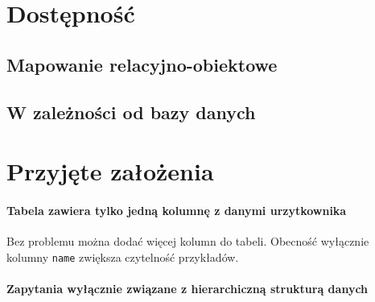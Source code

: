 \section{Dostępność}
\subsection{Mapowanie relacyjno-obiektowe}
\subsection{W zależności od bazy danych}


\section{Przyjęte założenia}

\paragraph{Tabela zawiera tylko jedną kolumnę z danymi urzytkownika} Bez problemu można dodać więcej kolumn do tabeli. Obecność wyłącznie kolumny \texttt{name} zwiększa czytelność przykładów.
\paragraph{Zapytania wyłącznie związane z hierarchiczną strukturą danych}